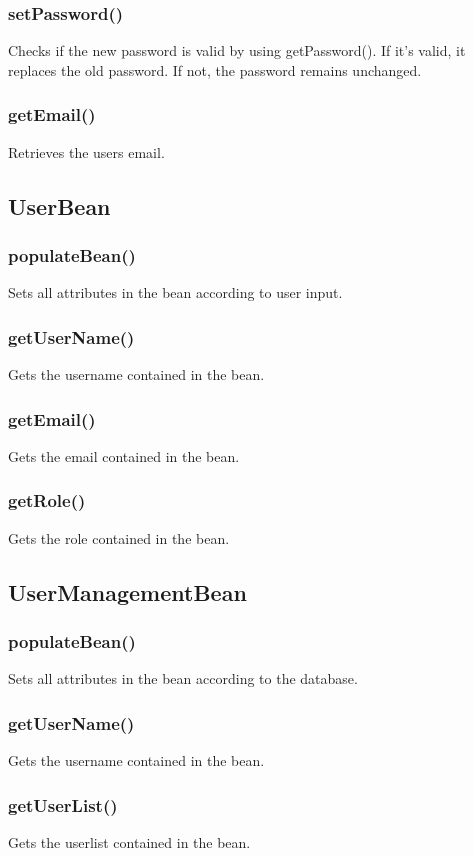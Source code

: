 \documentclass{article}
\begin{document}
\subsubsection{setPassword()}
Checks if the new password is valid by using getPassword(). If it's valid, it replaces the old password. If not, the password remains unchanged.
\subsubsection{getEmail()}
Retrieves the users email.

\subsection{UserBean}
\subsubsection{populateBean()}
Sets all attributes in the bean according to user input.
\subsubsection{getUserName()}
Gets the username contained in the bean.
\subsubsection{getEmail()}
Gets the email contained in the bean.
\subsubsection{getRole()}
Gets the role contained in the bean.

\subsection{UserManagementBean}
\subsubsection{populateBean()}
Sets all attributes in the bean according to the database.
\subsubsection{getUserName()}
Gets the username contained in the bean.
\subsubsection{getUserList()}
Gets the userlist contained in the bean.
\end{document}
